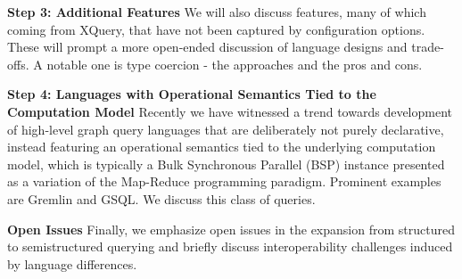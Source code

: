 \noindent \textbf{Step 3: Additional Features} We will also discuss features, many of which coming from XQuery, that have not been captured by configuration options. These will prompt a more open-ended discussion of language designs and trade-offs. A notable one is type coercion - the approaches and the pros and cons.

\noindent \textbf{Step 4: Languages with Operational Semantics Tied to the Computation Model}
Recently we have witnessed a trend towards development of high-level graph query languages that are deliberately not purely declarative, instead featuring an operational semantics tied to the
underlying computation model, which is typically a Bulk Synchronous Parallel (BSP) instance presented as a variation of the  Map-Reduce programming paradigm.
Prominent examples are Gremlin and GSQL. We discuss this class of queries.


\noindent \textbf{Open Issues} Finally, we emphasize open issues in the expansion from structured to semistructured querying and briefly discuss interoperability challenges induced by language differences.

